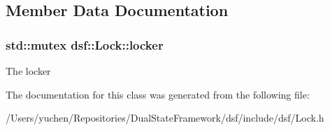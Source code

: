 \subsection{Member Data Documentation}
\hypertarget{classdsf_1_1_lock_a605f27e33e37dc8b3b920a3272461c44}{}
\subsubsection[{locker}]{\setlength{\rightskip}{0pt plus 5cm}std\+::mutex dsf\+::\+Lock\+::locker\hspace{0.3cm}{\ttfamily [protected]}}\label{classdsf_1_1_lock_a605f27e33e37dc8b3b920a3272461c44}
The locker 

The documentation for this class was generated from the following file\+:\begin{DoxyCompactItemize}
\item 
/\+Users/yuchen/\+Repositories/\+Dual\+State\+Framework/dsf/include/dsf/Lock.\+h\end{DoxyCompactItemize}
